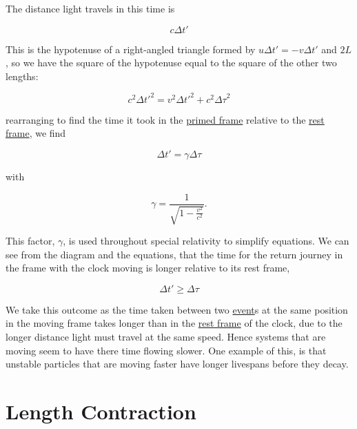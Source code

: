 The distance light travels in this time is

\begin{equation}
	{c}{\Delta t{'}}
\end{equation}

This is the hypotenuse of a right-angled triangle formed by ${u}{\Delta t{'}}=-{v}{\Delta t{'}}$ and $2{L}$, so we have the square of the hypotenuse equal to the square of the other two lengths:

\begin{equation}
	{c}^2 {\Delta t{'}}^2 = {v}^2 {\Delta t{'}}^2 + {c}^2{\Delta\tau}^2
\end{equation}

rearranging to find the time it took in the \hyperlink{def-Primed-Frame}{primed frame} relative to the \hyperlink{def-proper-frame}{rest frame}, we find

\begin{equation}
	\label{eq: time dilation}
	{\Delta t{'}} = {\gamma} {\Delta\tau}
\end{equation}

with

\begin{equation}
	{\gamma} = \frac{1}{\sqrt{1-\frac{{v}^2}{{c}^2}}}.
\end{equation}

This factor, ${\gamma}$, is used throughout special relativity to simplify equations.
We can see from the diagram and the equations, that the time for the return journey in the frame with the clock moving is longer relative to its rest frame,

\begin{equation}
	{\Delta t{'}} \geq {\Delta\tau}
\end{equation}

We take this outcome as the time taken between two \hyperlink{def-event}{event}s at the same position in the moving frame takes longer than in the \hyperlink{def-proper-frame}{rest frame} of the clock, due to the longer distance light must travel at the same speed.
Hence systems that are moving seem to have there time flowing slower.
One example of this, is that unstable particles that are moving faster have longer livespans before they decay.

\section{Length Contraction} \label{sect: Length Contraction}

